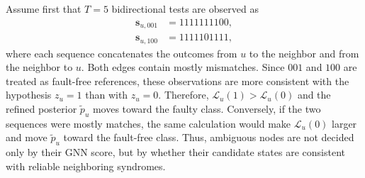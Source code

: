 Assume first that $T=5$ bidirectional tests are observed as
\begin{equation*}
\begin{aligned}
\mathbf{s}_{u,001}&=1111111100,\\
\mathbf{s}_{u,100}&=1111101111,
\end{aligned}
\end{equation*}
where each sequence concatenates the outcomes from $u$ to the neighbor and from the neighbor to $u$. Both edges contain mostly mismatches. Since $001$ and $100$ are treated as fault-free references, these observations are more consistent with the hypothesis $z_u=1$ than with $z_u=0$. Therefore, $\mathcal{L}_u(1)>\mathcal{L}_u(0)$ and the refined posterior $\tilde{p}_u$ moves toward the faulty class. Conversely, if the two sequences were mostly matches, the same calculation would make $\mathcal{L}_u(0)$ larger and move $\tilde{p}_u$ toward the fault-free class. Thus, ambiguous nodes are not decided only by their GNN score, but by whether their candidate states are consistent with reliable neighboring syndromes.
